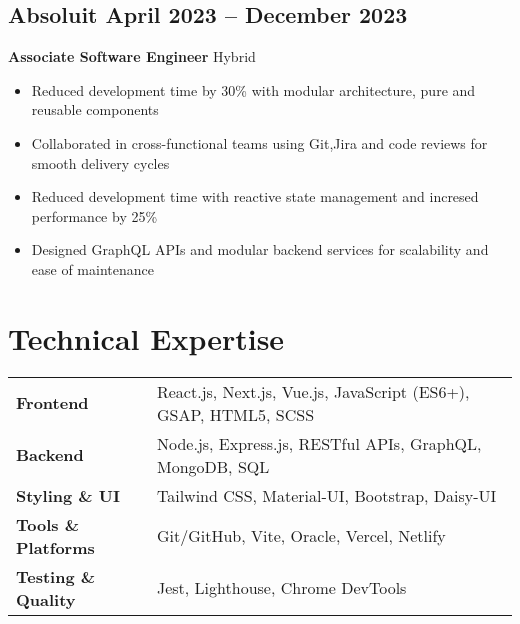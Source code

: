 \documentclass[11pt]{article}
\begin{document}
\subsection{\texorpdfstring{Absoluit \hfill April 2023 -- December 2023}{Absoluit, April 2023 -- December 2023}}
\textbf{Associate Software Engineer} \hfill Hybrid  
\begin{itemize}
\item Reduced development time by 30\% with modular architecture, pure and reusable components
\item Collaborated in cross-functional teams using Git,Jira and code reviews for smooth delivery cycles  
\item Reduced development time with reactive state management and incresed performance by 25\%
\item Designed GraphQL APIs and modular backend services for scalability and ease of maintenance  
\end{itemize}




\section{Technical Expertise}
\begin{tabularx}{\textwidth}{@{} l X @{}}
\textbf{Frontend} & React.js, Next.js, Vue.js, JavaScript (ES6+), GSAP, HTML5, SCSS \\
\textbf{Backend} & Node.js, Express.js, RESTful APIs, GraphQL, MongoDB, SQL \\
\textbf{Styling \& UI} & Tailwind CSS, Material-UI, Bootstrap, Daisy-UI \\
\textbf{Tools \& Platforms} & Git/GitHub, Vite, Oracle, Vercel, Netlify \\
\textbf{Testing \& Quality} & Jest, Lighthouse, Chrome DevTools \\
\end{tabularx}
\end{document}
